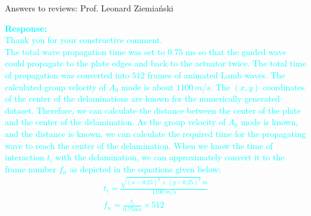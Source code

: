 \documentclass[10pt,aspectratio=169,dvipsnames]{beamer} %
\begin{document}
\begin{frame}{Answers to reviews: Prof. Leonard Ziemiański}
\begin{itemize}
{			\textcolor{Cyan}{
				\textbf{Response:} \\
				Thank you for your constructive comment. \\
				The total wave propagation time was set to \(0.75\) ms so that the guided wave could propagate to the plate edges and back to the actuator twice.
				The total time of propagation was converted into \(512\) frames of animated Lamb waves.
				The calculated group velocity of \(A_0\) mode is about \(1100\ m/s\).
				The \((x, y)\) coordinates of the center of the delaminations are known for the numerically generated dataset.
				Therefore, we can calculate the distance between the center of the plate and the center of the delamination.
				As the group velocity of \(A_0\) mode is known, and the distance is known, we can calculate the required time for the propagating wave to reach the center of the delamination. 
				When we know the time of interaction \(t_i\) with the delamination, we can approximately convert it to the frame number \(f_n\) as depicted in the equations given below:		
				\begin{gather*}
					t_i = \frac{\sqrt{(x-0.25)^2 +(y-0.25)^2} \ m}{1100\ m/s}
					\\
					f_n = \frac{t_i}{0.75ms} \times 512
				\end{gather*}			
			}}
		\end{itemize}
	\end{frame}
%		
\end{document}
